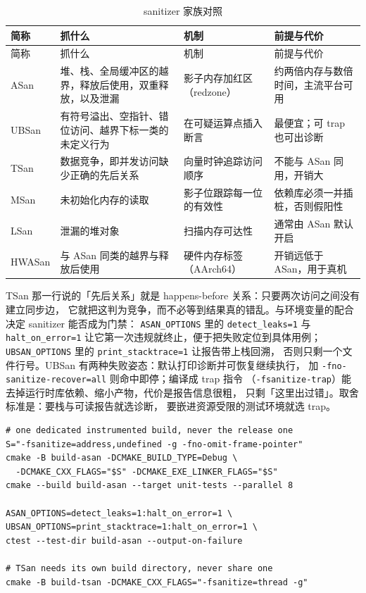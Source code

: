 \documentclass[12pt,a4paper,fontset=fandol]{ctexbook}
\begin{document}
\begin{longtable}{>{\raggedright\arraybackslash}p{}>{\raggedright\arraybackslash}p{}>{\raggedright\arraybackslash}p{}>{\raggedright\arraybackslash}p{}}
\caption{sanitizer 家族对照}\label{tab:ch15-san}\\
\toprule
简称 & 抓什么 & 机制 & 前提与代价 \\
\midrule
\endfirsthead
\toprule
简称 & 抓什么 & 机制 & 前提与代价 \\
\midrule
\endhead
ASan & 堆、栈、全局缓冲区的越界，释放后使用，双重释放，以及泄漏 & 影子内存加红区（redzone） & 约两倍内存与数倍时间，主流平台可用 \\
UBSan & 有符号溢出、空指针、错位访问、越界下标一类的未定义行为 & 在可疑运算点插入断言 & 最便宜；可 trap 也可出诊断 \\
TSan & 数据竞争，即并发访问缺少正确的先后关系 & 向量时钟追踪访问顺序 & 不能与 ASan 同用，开销大 \\
MSan & 未初始化内存的读取 & 影子位跟踪每一位的有效性 & 依赖库必须一并插桩，否则假阳性 \\
LSan & 泄漏的堆对象 & 扫描内存可达性 & 通常由 ASan 默认开启 \\
HWASan & 与 ASan 同类的越界与释放后使用 & 硬件内存标签（AArch64） & 开销远低于 ASan，用于真机 \\
\bottomrule
\end{longtable}

TSan 那一行说的「先后关系」就是 happens-before 关系：只要两次访问之间没有建立同步边，
它就把这判为竞争，而不必等到结果真的错乱。与环境变量的配合决定 sanitizer 能否成为门禁：
\texttt{ASAN\_OPTIONS} 里的 \texttt{detect\_leaks=1} 与 \texttt{halt\_on\_error=1}
让它第一次违规就终止，便于把失败定位到具体用例；
\texttt{UBSAN\_OPTIONS} 里的 \texttt{print\_stacktrace=1} 让报告带上栈回溯，
否则只剩一个文件行号。UBSan 有两种失败姿态：默认打印诊断并可恢复继续执行，
加 \texttt{-fno-sanitize-recover=all} 则命中即停；编译成 trap 指令
（\texttt{-fsanitize-trap}）能去掉运行时库依赖、缩小产物，代价是报告信息很粗，
只剩「这里出过错」。取舍标准是：要栈与可读报告就选诊断，
要嵌进资源受限的测试环境就选 trap。

\begin{lstlisting}[style=shellstyle,caption={CI 里 sanitizer 与单元测试的配对},label={lst:ch15-san-ci}]
# one dedicated instrumented build, never the release one
S="-fsanitize=address,undefined -g -fno-omit-frame-pointer"
cmake -B build-asan -DCMAKE_BUILD_TYPE=Debug \
  -DCMAKE_CXX_FLAGS="$S" -DCMAKE_EXE_LINKER_FLAGS="$S"
cmake --build build-asan --target unit-tests --parallel 8

ASAN_OPTIONS=detect_leaks=1:halt_on_error=1 \
UBSAN_OPTIONS=print_stacktrace=1:halt_on_error=1 \
ctest --test-dir build-asan --output-on-failure

# TSan needs its own build directory, never share one
cmake -B build-tsan -DCMAKE_CXX_FLAGS="-fsanitize=thread -g"
\end{lstlisting}
\end{document}
